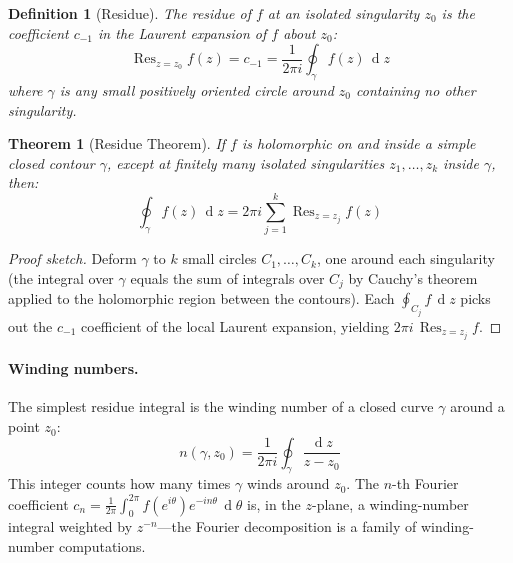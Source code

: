 \documentclass[12pt,a4paper]{report}
\DeclareMathOperator{\deriv}{d}
\theoremstyle{thms}
\newtheorem{theorem}{Theorem}[section]
\theoremstyle{defns}
\newtheorem{definition}{Definition}[section]
\begin{document}
\begin{definition}[Residue]
    The \textit{residue} of $f$ at an isolated singularity $z_0$ is the coefficient $c_{-1}$ in the Laurent expansion of $f$ about $z_0$:
    \begin{equation}
        \operatorname{Res}_{z = z_0} f(z) = c_{-1} = \dfrac{1}{2\pi i}\oint_\gamma f(z)\,\deriv{z}
    \end{equation}
    where $\gamma$ is any small positively oriented circle around $z_0$ containing no other singularity.
\end{definition}

\begin{theorem}[Residue Theorem]
    If $f$ is holomorphic on and inside a simple closed contour $\gamma$, except at finitely many isolated singularities $z_1, \ldots, z_k$ inside $\gamma$, then:
    \begin{equation}
        \oint_\gamma f(z)\,\deriv{z} = 2\pi i \sum_{j=1}^{k} \operatorname{Res}_{z = z_j} f(z)
    \end{equation}
    \label{thm:residue}
\end{theorem}

\begin{proof}[Proof sketch]
    Deform $\gamma$ to $k$ small circles $C_1, \ldots, C_k$, one around each singularity (the integral over $\gamma$ equals the sum of integrals over $C_j$ by Cauchy's theorem applied to the holomorphic region between the contours). Each $\oint_{C_j} f\,\deriv{z}$ picks out the $c_{-1}$ coefficient of the local Laurent expansion, yielding $2\pi i\,\operatorname{Res}_{z = z_j} f$.
\end{proof}

\paragraph{Winding numbers.} The simplest residue integral is the winding number of a closed curve $\gamma$ around a point $z_0$:
\begin{equation}
    n(\gamma, z_0) = \dfrac{1}{2\pi i}\oint_\gamma \dfrac{\deriv{z}}{z - z_0}
\end{equation}
This integer counts how many times $\gamma$ winds around $z_0$. The $n$-th Fourier coefficient $c_n = \frac{1}{2\pi}\int_0^{2\pi} f(e^{i\theta})e^{-in\theta}\,\deriv{\theta}$ is, in the $z$-plane, a winding-number integral weighted by $z^{-n}$—the Fourier decomposition is a family of winding-number computations.
\end{document}
